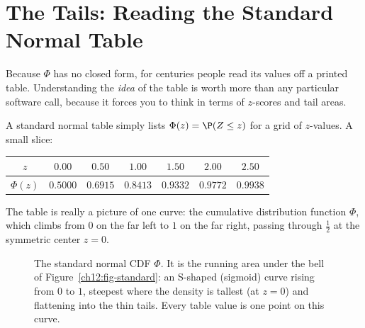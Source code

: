 \section{The Tails: Reading the Standard Normal Table}
\label{ch12:table}

Because $\Phi$ has no closed form, for centuries people read its values off a
printed table. Understanding the \emph{idea} of the table is worth more than any
particular software call, because it forces you to think in terms of $z$-scores
and tail areas.

A standard normal table simply lists $\Phi(z) = \P(Z \le z)$ for a grid of
$z$-values. A small slice:

\begin{center}
\begin{tabular}{ccccccc}
\toprule
$z$ & $0.00$ & $0.50$ & $1.00$ & $1.50$ & $2.00$ & $2.50$\\
\midrule
$\Phi(z)$ & $0.5000$ & $0.6915$ & $0.8413$ & $0.9332$ & $0.9772$ & $0.9938$\\
\bottomrule
\end{tabular}
\end{center}

The table is really a picture of one curve: the cumulative distribution function
$\Phi$, which climbs from $0$ on the far left to $1$ on the far right, passing
through $\tfrac12$ at the symmetric center $z=0$.

\begin{figure}[H]
\centering
{}
\caption{The standard normal CDF $\Phi$. It is the running area under the bell of
Figure~\ref{ch12:fig-standard}: an S-shaped (sigmoid) curve rising from $0$ to
$1$, steepest where the density is tallest (at $z=0$) and flattening into the
thin tails. Every table value is one point on this curve.}
\label{ch12:fig-cdf}
\end{figure}

